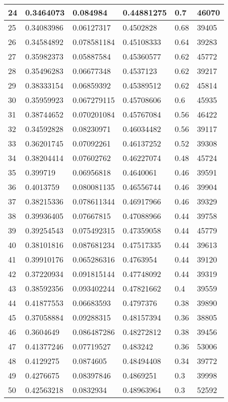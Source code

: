 \begin{longtable}{|l|l|l|l|l|l|}
24 & 0.3464073 & 0.084984 & 0.44881275 & 0.7 & 46070 \\ \hline 
25 & 0.34083986 & 0.06127317 & 0.4502828 & 0.68 & 39405 \\ \hline 
26 & 0.34584892 & 0.078581184 & 0.45108333 & 0.64 & 39283 \\ \hline 
27 & 0.35982373 & 0.05887584 & 0.45360577 & 0.62 & 45772 \\ \hline 
28 & 0.35496283 & 0.06677348 & 0.4537123 & 0.62 & 39217 \\ \hline 
29 & 0.38333154 & 0.06859392 & 0.45389512 & 0.62 & 45814 \\ \hline 
30 & 0.35959923 & 0.067279115 & 0.45708606 & 0.6 & 45935 \\ \hline 
31 & 0.38744652 & 0.070201084 & 0.45767084 & 0.56 & 46422 \\ \hline 
32 & 0.34592828 & 0.08230971 & 0.46034482 & 0.56 & 39117 \\ \hline 
33 & 0.36201745 & 0.07092261 & 0.46137252 & 0.52 & 39308 \\ \hline 
34 & 0.38204414 & 0.07602762 & 0.46227074 & 0.48 & 45724 \\ \hline 
35 & 0.399719 & 0.06956818 & 0.4640061 & 0.46 & 39591 \\ \hline 
36 & 0.4013759 & 0.080081135 & 0.46556744 & 0.46 & 39904 \\ \hline 
37 & 0.38215336 & 0.078611344 & 0.46917966 & 0.46 & 39329 \\ \hline 
38 & 0.39936405 & 0.07667815 & 0.47088966 & 0.44 & 39758 \\ \hline 
39 & 0.39254543 & 0.075492315 & 0.47359058 & 0.44 & 45779 \\ \hline 
40 & 0.38101816 & 0.087681234 & 0.47517335 & 0.44 & 39613 \\ \hline 
41 & 0.39910176 & 0.065286316 & 0.4763954 & 0.44 & 39120 \\ \hline 
42 & 0.37220934 & 0.091815144 & 0.47748092 & 0.44 & 39319 \\ \hline 
43 & 0.38592356 & 0.093402244 & 0.47821662 & 0.4 & 39559 \\ \hline 
44 & 0.41877553 & 0.06683593 & 0.4797376 & 0.38 & 39890 \\ \hline 
45 & 0.37058884 & 0.09288315 & 0.48157394 & 0.36 & 38805 \\ \hline 
46 & 0.3604649 & 0.086487286 & 0.48272812 & 0.38 & 39456 \\ \hline 
47 & 0.41377246 & 0.07719527 & 0.483242 & 0.36 & 53006 \\ \hline 
48 & 0.4129275 & 0.0874605 & 0.48494408 & 0.34 & 39772 \\ \hline 
49 & 0.4276675 & 0.08397846 & 0.4869251 & 0.3 & 39998 \\ \hline 
50 & 0.42563218 & 0.0832934 & 0.48963964 & 0.3 & 52592 \\ \hline 
\end{longtable}